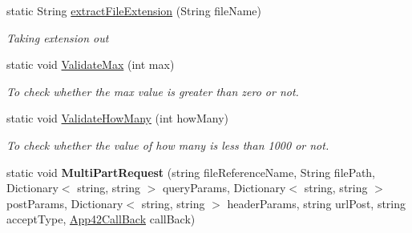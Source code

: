 \begin{DoxyCompactItemize}
\item 
static String \hyperlink{classcom_1_1shephertz_1_1app42_1_1paas_1_1sdk_1_1csharp_1_1util_1_1_util_aee68725831fc40f65b5bdb689bb060c3}{extract\+File\+Extension} (String file\+Name)
\begin{DoxyCompactList}\small\item\em Taking extension out \end{DoxyCompactList}\item 
static void \hyperlink{classcom_1_1shephertz_1_1app42_1_1paas_1_1sdk_1_1csharp_1_1util_1_1_util_a86e3d4c6614e9f2554d3db6c795a2343}{Validate\+Max} (int max)
\begin{DoxyCompactList}\small\item\em To check whether the max value is greater than zero or not. \end{DoxyCompactList}\item 
static void \hyperlink{classcom_1_1shephertz_1_1app42_1_1paas_1_1sdk_1_1csharp_1_1util_1_1_util_a54f423333022dafb52b15c7289129ae6}{Validate\+How\+Many} (int how\+Many)
\begin{DoxyCompactList}\small\item\em To check whether the value of how many is less than 1000 or not. \end{DoxyCompactList}\item 
\hypertarget{classcom_1_1shephertz_1_1app42_1_1paas_1_1sdk_1_1csharp_1_1util_1_1_util_a6160e6f03e658b613333aaf87256fa36}{static void {\bfseries Multi\+Part\+Request} (string file\+Reference\+Name, String file\+Path, Dictionary$<$ string, string $>$ query\+Params, Dictionary$<$ string, string $>$ post\+Params, Dictionary$<$ string, string $>$ header\+Params, string url\+Post, string accept\+Type, \hyperlink{interfacecom_1_1shephertz_1_1app42_1_1paas_1_1sdk_1_1csharp_1_1_app42_call_back}{App42\+Call\+Back} call\+Back)}\label{classcom_1_1shephertz_1_1app42_1_1paas_1_1sdk_1_1csharp_1_1util_1_1_util_a6160e6f03e658b613333aaf87256fa36}


\end{DoxyCompactItemize}
